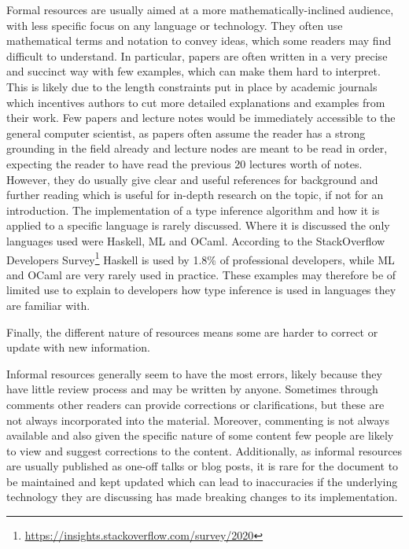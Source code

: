 \documentclass[a4paper,fleqn,oneside,12pt]{report}
\begin{document}
Formal resources are usually aimed at a more mathematically-inclined audience, with less specific focus on any language or technology. They often use mathematical terms and notation to convey ideas, which some readers may find difficult to understand. In particular, papers are often written in a very precise and succinct way with few examples, which can make them hard to interpret. This is likely due to the length constraints put in place by academic journals which incentives authors to cut more detailed explanations and examples from their work. Few papers and lecture notes would be immediately accessible to the general computer scientist, as papers often assume the reader has a strong grounding in the field already and lecture nodes are meant to be read in order, expecting the reader to have read the previous 20 lectures worth of notes. However, they do usually give clear and useful references for background and further reading which is useful for in-depth research on the topic, if not for an introduction. The implementation of a type inference algorithm and how it is applied to a specific language is rarely discussed. Where it is discussed the only languages used were Haskell, ML and OCaml. According to the StackOverflow Developers Survey\footnote{\underline{\href{https://insights.stackoverflow.com/survey/2020\#technology-programming-scripting-and-markup-languages}{https://insights.stackoverflow.com/survey/2020}}} Haskell is used by 1.8\% of professional developers, while ML and OCaml are very rarely used in practice. These examples may therefore be of limited use to explain to developers how type inference is used in languages they are familiar with.

Finally, the different nature of resources means some are harder to correct or update with new information.

Informal resources generally seem to have the most errors, likely because they have little review process and may be written by anyone. Sometimes through comments other readers can provide corrections or clarifications, but these are not always incorporated into the material. Moreover, commenting is not always available and also given the specific nature of some content few people are likely to view and suggest corrections to the content. Additionally, as informal resources are usually published as one-off talks or blog posts, it is rare for the document to be maintained and kept updated which can lead to inaccuracies if the underlying technology they are discussing has made breaking changes to its implementation.
\end{document}
